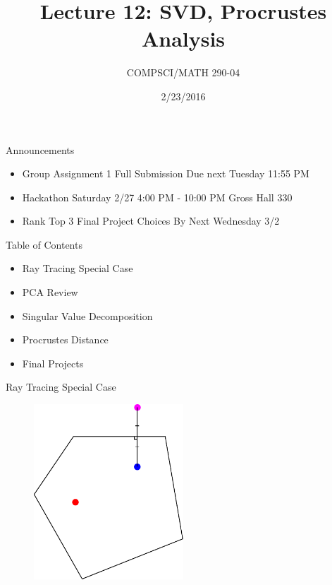 \documentclass{beamer}
\title{Lecture 12: SVD, Procrustes Analysis}
\date{2/23/2016}
\institute{Chris Tralie, Duke University}
\author{COMPSCI/MATH 290-04}
\begin{document}
\frame{\titlepage}

\begin{frame}{Announcements}
\begin{itemize}[label=$\vartriangleright$]

\item Group Assignment 1 Full Submission Due next Tuesday 11:55 PM

\item Hackathon Saturday 2/27 4:00 PM - 10:00 PM Gross Hall 330

\item Rank Top 3 Final Project Choices By Next Wednesday 3/2

\end{itemize}

\end{frame}

\begin{frame}{Table of Contents}
\begin{itemize}[label=$\blacktriangleright$]
	\item Ray Tracing Special Case
\end{itemize}
\begin{itemize}[label=$\vartriangleright$]
	\item PCA Review
\end{itemize}
\begin{itemize}[label=$\vartriangleright$]
	\item Singular Value Decomposition
\end{itemize}
\begin{itemize}[label=$\vartriangleright$]
	\item Procrustes Distance
\end{itemize}
\begin{itemize}[label=$\vartriangleright$]
	\item Final Projects
\end{itemize}
\end{frame}

\begin{frame}{Ray Tracing Special Case}

\begin{figure}[t]
\centering
\includegraphics[width=0.5\textwidth]{ImageSourcesDrawn1.pdf}
\end{figure}

\end{frame}
\end{document}
